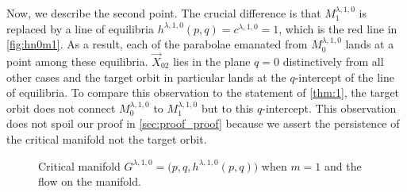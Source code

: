 \documentclass[a4paper,11pt]{article}
\numberwithin{step}{dummy}
\begin{document}
Now, we describe the second point. The crucial difference is that $M_1^{\lambda,1,0}$ is replaced by a line of equilibria $h^{\lambda,1,0}(p,q) = c^{\lambda,1,0}=1$, which is the red line in \eqref{fig:hn0m1}. As a result, each of the parabolae emanated from $M_0^{\lambda,1,0}$ lands at a point among these equilibria. $\vec{X}_{02}$ lies in the plane $q=0$ distinctively from all other cases and the target orbit in particular lands at the $q$-intercept of the line of equilibria. To compare this observation to the statement of \eqref{thm:1}, the target orbit does not connect $M_0^{ \lambda,1,0}$ to $M_1^{ \lambda,1,0}$ but to this $q$-intercept. This observation does not spoil our proof in \eqref{sec:proof_proof} because we assert the persistence of the critical manifold not the target orbit.
\begin{figure}[h]
  \centering
  \caption{Critical manifold $G^{\lambda,1,0}=\big(p,q,h^{ \lambda,1,0}(p,q)\big)$ when $m=1$ and the flow on the manifold.}\label{fig:hn0m1}
\end{figure}
\end{document}
